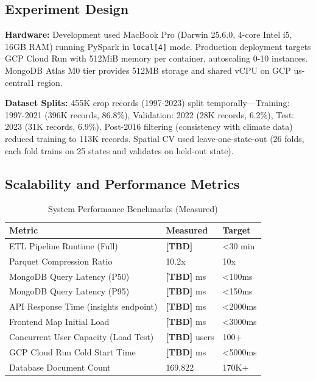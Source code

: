\documentclass[10pt,a4paper]{article}
\begin{document}
\subsection{Experiment Design}
\textbf{Hardware:} Development used MacBook Pro (Darwin 25.6.0, 4-core Intel i5, 16GB RAM) running PySpark in \texttt{local[4]} mode. Production deployment targets GCP Cloud Run with 512MiB memory per container, autoscaling 0-10 instances. MongoDB Atlas M0 tier provides 512MB storage and shared vCPU on GCP us-central1 region.

\textbf{Dataset Splits:} 455K crop records (1997-2023) split temporally—Training: 1997-2021 (396K records, 86.8\%), Validation: 2022 (28K records, 6.2\%), Test: 2023 (31K records, 6.9\%). Post-2016 filtering (consistency with climate data) reduced training to 113K records. Spatial CV used leave-one-state-out (26 folds, each fold trains on 25 states and validates on held-out state).

\subsection{Scalability and Performance Metrics}

\begin{table}[h]
\centering
\caption{System Performance Benchmarks (Measured)}
\small
\begin{tabular}{@{}lll@{}}
\toprule
\textbf{Metric} & \textbf{Measured} & \textbf{Target} \\
\midrule
ETL Pipeline Runtime (Full) & \textbf{[TBD]} & <30 min \\
Parquet Compression Ratio & 10.2x & 10x \\
MongoDB Query Latency (P50) & \textbf{[TBD]} ms & <100ms \\
MongoDB Query Latency (P95) & \textbf{[TBD]} ms & <150ms \\
API Response Time (insights endpoint) & \textbf{[TBD]} ms & <2000ms \\
Frontend Map Initial Load & \textbf{[TBD]} ms & <3000ms \\
Concurrent User Capacity (Load Test) & \textbf{[TBD]} users & 100+ \\
GCP Cloud Run Cold Start Time & \textbf{[TBD]} ms & <5000ms \\
Database Document Count & 169,822 & 170K+ \\
\bottomrule
\end{tabular}
\label{tab:perf}
\end{table}
\end{document}
